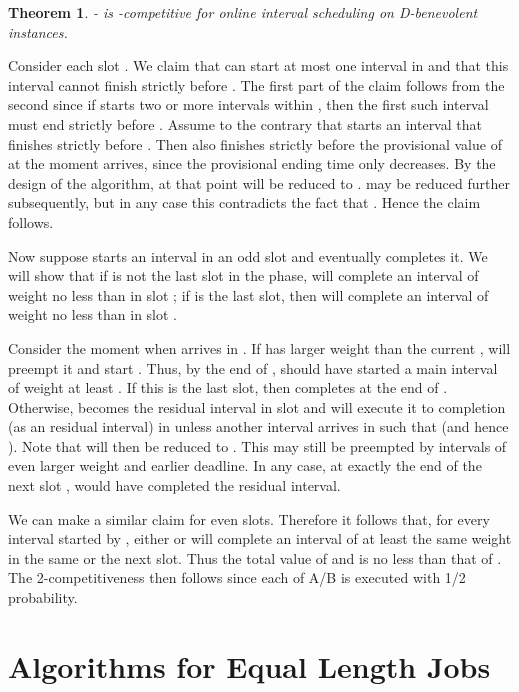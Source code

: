 \documentclass[11pt]{article}
\newtheorem{theorem}{Theorem}[section]
\newcommand{\qed}{\hspace*{\fill}\par\medskip}
\newenvironment{proof}{\noindent{\it Proof. }\ignorespaces}{\qed}
\begin{document}
\begin{theorem}
- is -competitive for online interval scheduling on
D-benevolent instances.
\end{theorem}
\begin{proof}
Consider each slot .
We claim that  can start at most one interval in 
and that this interval cannot finish strictly before .
The first part of the claim follows from the second since
if  starts two or more intervals within , then the first 
such interval must end strictly before . 
Assume to the contrary that  starts an interval  that finishes
strictly before . 
Then  also finishes strictly before the provisional value of  
at the moment  arrives, since the provisional ending time only decreases.
By the design of the algorithm, at that point
 will be reduced to . 
 may be reduced further subsequently, but in any case this contradicts
the fact that .
Hence the claim follows.

Now suppose  starts an interval  in an odd slot  and eventually
completes it.
We will show that if  is not the last slot in the phase, 
 will complete an interval of weight no less than  in slot ;
if  is the last slot, then  will complete an interval of weight
no less than  in slot .

Consider the moment when  arrives in .
If  has larger weight than the current ,
 will preempt it and start .
Thus, by the end of ,
 should have started a main interval  of weight at least .
If this is the last slot, then  completes  at the end of .
Otherwise,  becomes the residual interval in slot 
and  will execute it to completion (as an residual interval) in 
unless another interval  arrives in  such that 
 (and hence ).
Note that  will then be reduced to .
This  may still be preempted by intervals of even larger weight
and earlier deadline.
In any case, at exactly the end of the next slot ,
 would have completed the residual interval.

We can make a similar claim for even slots.
Therefore it follows that, for every interval started by , 
either  or  will complete an interval of at least the same weight 
in the same or the next slot.
Thus the total value of  and  is no less than that of .
The 2-competitiveness then follows since each of A/B is executed with
1/2 probability.  
\end{proof}

\section{Algorithms for Equal Length Jobs}
\end{document}
